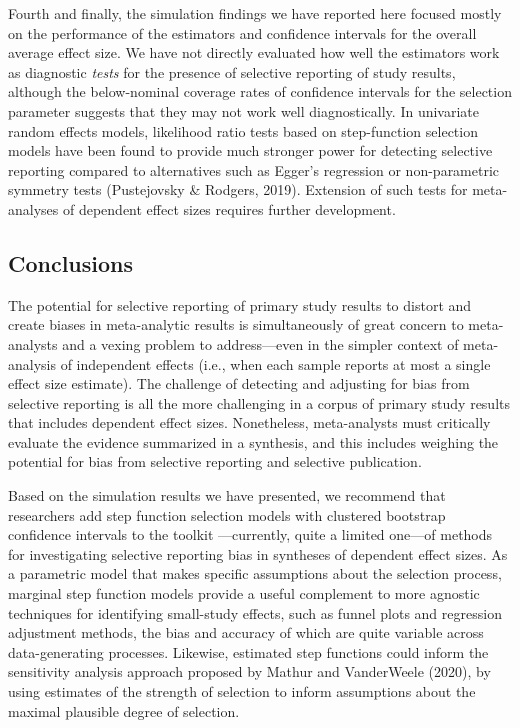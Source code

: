 \documentclass[
  man, donotrepeattitle,floatsintext]{apa7}
\begin{document}
Fourth and finally, the simulation findings we have reported here focused mostly on the performance of the estimators and confidence intervals for the overall average effect size.
We have not directly evaluated how well the estimators work as diagnostic \emph{tests} for the presence of selective reporting of study results, although the below-nominal coverage rates of confidence intervals for the selection parameter suggests that they may not work well diagnostically.
In univariate random effects models, likelihood ratio tests based on step-function selection models have been found to provide much stronger power for detecting selective reporting compared to alternatives such as Egger's regression or non-parametric symmetry tests (Pustejovsky \& Rodgers, 2019).
Extension of such tests for meta-analyses of dependent effect sizes requires further development.

\subsection{Conclusions}\label{conclusions}

The potential for selective reporting of primary study results to distort and create biases in meta-analytic results is simultaneously of great concern to meta-analysts and a vexing problem to address---even in the simpler context of meta-analysis of independent effects (i.e., when each sample reports at most a single effect size estimate).
The challenge of detecting and adjusting for bias from selective reporting is all the more challenging in a corpus of primary study results that includes dependent effect sizes.
Nonetheless, meta-analysts must critically evaluate the evidence summarized in a synthesis, and this includes weighing the potential for bias from selective reporting and selective publication.

Based on the simulation results we have presented, we recommend that researchers add step function selection models with clustered bootstrap confidence intervals to the toolkit ---currently, quite a limited one---of methods for investigating selective reporting bias in syntheses of dependent effect sizes.
As a parametric model that makes specific assumptions about the selection process, marginal step function models provide a useful complement to more agnostic techniques for identifying small-study effects, such as funnel plots and regression adjustment methods, the bias and accuracy of which are quite variable across data-generating processes.
Likewise, estimated step functions could inform the sensitivity analysis approach proposed by Mathur and VanderWeele (2020), by using estimates of the strength of selection to inform assumptions about the maximal plausible degree of selection.
\end{document}
